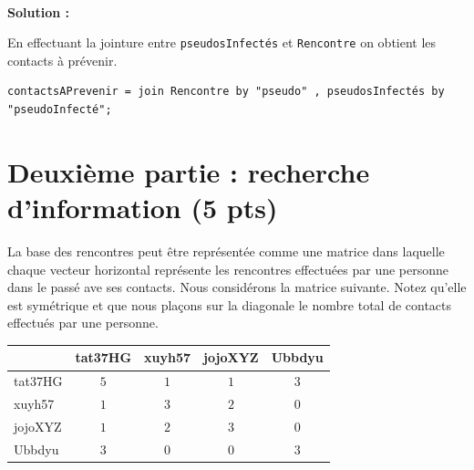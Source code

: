 \documentclass[11pt,a4paper]{article}
\newenvironment{solution}[0]{
~\\ \color{red} \textbf{Solution : }\color{black}}{%
}
\begin{document}
\begin{solution}
\begin{enumerate}
   En effectuant la jointure entre  \texttt{pseudosInfectés} et \texttt{Rencontre}
   on obtient les contacts à prévenir.
   
\begin{small}
\begin{verbatim}
contactsAPrevenir = join Rencontre by "pseudo" , pseudosInfectés by "pseudoInfecté";
\end{verbatim}
\end{small}

\end{enumerate}

\end{solution}

\section{Deuxième partie : recherche d'information (5 pts)}


La base des rencontres peut être représentée
comme une matrice dans laquelle chaque vecteur horizontal représente les
rencontres effectuées par une personne dans le passé ave ses contacts.
Nous considérons la matrice suivante. Notez qu'elle est symétrique
et que nous plaçons sur la diagonale le nombre total de contacts 
effectués par une personne.

\begin{center}
\begin{tabular}{l|c|c|c|c}
            & tat37HG & xuyh57 & jojoXYZ & Ubbdyu \\ \hline  
   tat37HG  & $5$ &  $1$   & $1$     & $3$   \\
   xuyh57   & $1$    & $3$  & $2$   & $0$ \\
   jojoXYZ  & $1$   & $2$  &   $3$  &  $0$        \\
   Ubbdyu   &  $3$  &  $0$         & 0           & $3$     \\\hline
   \end{tabular}
\end{center}
\end{document}
